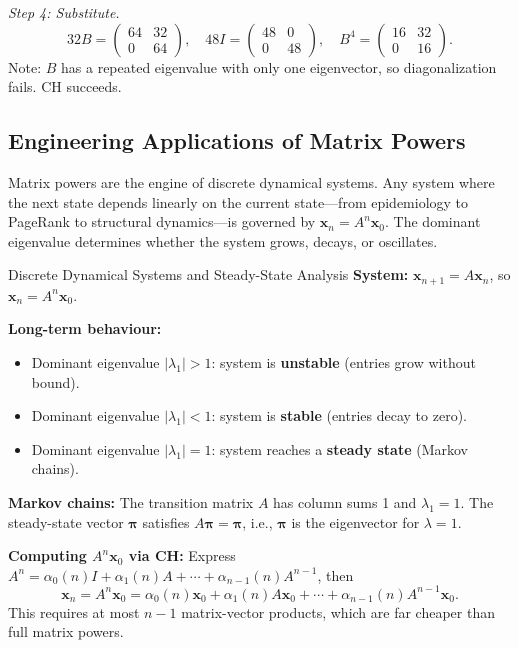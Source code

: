 \documentclass[12pt,a4paper]{article}
\begin{document}
\textit{Step 4: Substitute.}
\[
  32B = \begin{pmatrix}64&32\\0&64\end{pmatrix},\quad 48I = \begin{pmatrix}48&0\\0&48\end{pmatrix},
  \quad B^4 = \begin{pmatrix}16&32\\0&16\end{pmatrix}.
\]
Note: \(B\) has a repeated eigenvalue with only one eigenvector, so diagonalization fails. CH succeeds.

\subsection{Engineering Applications of Matrix Powers}

Matrix powers are the engine of discrete dynamical systems. Any system where the next state depends linearly on the current state---from epidemiology to PageRank to structural dynamics---is governed by \(\mathbf{x}_n = A^n\mathbf{x}_0\). The dominant eigenvalue determines whether the system grows, decays, or oscillates.

\begin{infobox}{Discrete Dynamical Systems and Steady-State Analysis}
\textbf{System:} \(\mathbf{x}_{n+1} = A\mathbf{x}_n\), so \(\mathbf{x}_n = A^n \mathbf{x}_0\).

\textbf{Long-term behaviour:}
\begin{itemize}
  \item Dominant eigenvalue \(|\lambda_1| > 1\): system is \textbf{unstable} (entries grow without bound).
  \item Dominant eigenvalue \(|\lambda_1| < 1\): system is \textbf{stable} (entries decay to zero).
  \item Dominant eigenvalue \(|\lambda_1| = 1\): system reaches a \textbf{steady state} (Markov chains).
\end{itemize}
\textbf{Markov chains:} The transition matrix \(A\) has column sums 1 and \(\lambda_1 = 1\). The steady-state vector \(\boldsymbol{\pi}\) satisfies \(A\boldsymbol{\pi} = \boldsymbol{\pi}\), i.e., \(\boldsymbol{\pi}\) is the eigenvector for \(\lambda = 1\).

\textbf{Computing \(A^n\mathbf{x}_0\) via CH:} Express \(A^n = \alpha_0(n)I + \alpha_1(n)A + \cdots + \alpha_{n-1}(n)A^{n-1}\), then
\[
  \mathbf{x}_n = A^n\mathbf{x}_0 = \alpha_0(n)\mathbf{x}_0 + \alpha_1(n)A\mathbf{x}_0 + \cdots + \alpha_{n-1}(n)A^{n-1}\mathbf{x}_0.
\]
This requires at most \(n-1\) matrix-vector products, which are far cheaper than full matrix powers.
\end{infobox}
\end{document}
